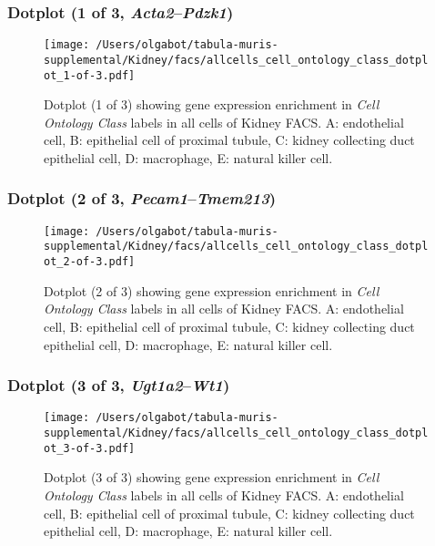 \clearpage

\subsubsection{Dotplot (1 of 3, \emph{Acta2}--\emph{Pdzk1})}
\begin{figure}[h]
\centering
\texttt{[image: /Users/olgabot/tabula-muris-supplemental/Kidney/facs/allcells\_cell\_ontology\_class\_dotplot\_1-of-3.pdf]}

\caption{ Dotplot (1 of 3)  showing gene expression enrichment in \emph{Cell Ontology Class} labels in all cells of Kidney FACS. A: endothelial cell, B: epithelial cell of proximal tubule, C: kidney collecting duct epithelial cell, D: macrophage, E: natural killer cell.}
\end{figure}


\clearpage

\subsubsection{Dotplot (2 of 3, \emph{Pecam1}--\emph{Tmem213})}
\begin{figure}[h]
\centering
\texttt{[image: /Users/olgabot/tabula-muris-supplemental/Kidney/facs/allcells\_cell\_ontology\_class\_dotplot\_2-of-3.pdf]}

\caption{ Dotplot (2 of 3)  showing gene expression enrichment in \emph{Cell Ontology Class} labels in all cells of Kidney FACS. A: endothelial cell, B: epithelial cell of proximal tubule, C: kidney collecting duct epithelial cell, D: macrophage, E: natural killer cell.}
\end{figure}


\clearpage

\subsubsection{Dotplot (3 of 3, \emph{Ugt1a2}--\emph{Wt1})}
\begin{figure}[h]
\centering
\texttt{[image: /Users/olgabot/tabula-muris-supplemental/Kidney/facs/allcells\_cell\_ontology\_class\_dotplot\_3-of-3.pdf]}

\caption{ Dotplot (3 of 3)  showing gene expression enrichment in \emph{Cell Ontology Class} labels in all cells of Kidney FACS. A: endothelial cell, B: epithelial cell of proximal tubule, C: kidney collecting duct epithelial cell, D: macrophage, E: natural killer cell.}
\end{figure}



